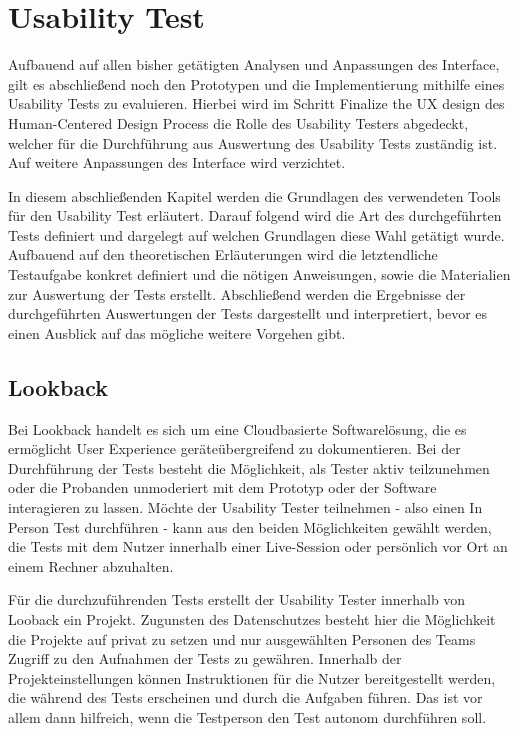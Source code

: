 \chapter{Usability Test}\label{ch:outlook}

Aufbauend auf allen bisher getätigten Analysen und Anpassungen des Interface, gilt es abschließend noch den Prototypen und die Implementierung mithilfe eines Usability Tests zu evaluieren.
Hierbei wird im Schritt \glqq Finalize the UX design\grqq{} des Human-Centered Design Process die Rolle des Usability Testers abgedeckt, welcher für die Durchführung aus Auswertung des Usability Tests zuständig ist.
Auf weitere Anpassungen des Interface wird verzichtet.

In diesem abschließenden Kapitel werden die Grundlagen des verwendeten Tools für den Usability Test erläutert.
Darauf folgend wird die Art des durchgeführten Tests definiert und dargelegt auf welchen Grundlagen diese Wahl getätigt wurde.
Aufbauend auf den theoretischen Erläuterungen wird die letztendliche Testaufgabe konkret definiert und die nötigen Anweisungen, sowie die Materialien zur Auswertung der Tests erstellt.
Abschließend werden die Ergebnisse der durchgeführten Auswertungen der Tests dargestellt und interpretiert, bevor es einen Ausblick auf das mögliche weitere Vorgehen gibt.

\section{Lookback}

Bei Lookback handelt es sich um eine Cloudbasierte Softwarelösung, die es ermöglicht User Experience geräteübergreifend zu dokumentieren.
Bei der Durchführung der Tests besteht die Möglichkeit, als Tester aktiv teilzunehmen oder die Probanden unmoderiert mit dem Prototyp oder der Software interagieren zu lassen.
Möchte der Usability Tester teilnehmen -  also einen \glqq In Person\grqq{} Test durchführen - kann aus den beiden Möglichkeiten gewählt werden, die Tests mit dem Nutzer innerhalb einer Live-Session oder persönlich vor Ort an einem Rechner abzuhalten.

Für die durchzuführenden Tests erstellt der Usability Tester innerhalb von Looback ein Projekt.
Zugunsten des Datenschutzes besteht hier die Möglichkeit die Projekte auf privat zu setzen und nur ausgewählten Personen des Teams Zugriff zu den Aufnahmen  der Tests zu gewähren.
Innerhalb der Projekteinstellungen können Instruktionen für die Nutzer bereitgestellt werden, die während des Tests erscheinen und durch die Aufgaben führen.
Das ist vor allem dann hilfreich, wenn die Testperson den Test autonom durchführen soll.

